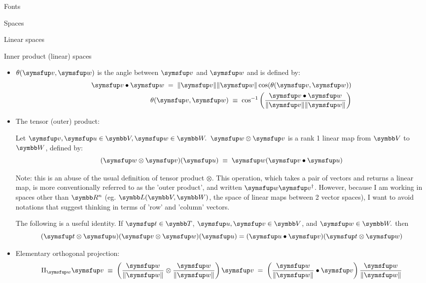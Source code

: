\documentclass[12pt]{PalisadesLakesArticle}
\begin{document}
\begin{plSection}{Fonts}
\begin{plSection}{Spaces}
\begin{plSection}{Linear spaces}
\begin{plSection}{Inner product (linear) spaces}
\begin{itemize}
\item $\theta(\Vector{v},\Vector{w})$ is the angle between $\Vector{v}$ and $\Vector{w}$
and is defined by:
\begin{eqnarray}
\Vector{v} \bullet \Vector{w} \; = \; \| \Vector{v} \| \| \Vector{w} \| \cos(\theta(\Vector{v},\Vector{w}))
\\
\theta(\Vector{v},\Vector{w})
\; \equiv \;
\cos^{-1} \left(\frac{ \Vector{v} \bullet \Vector{w} }{\| \Vector{v} \| \| \Vector{w} \| } \right)
\nonumber
\end{eqnarray}

\item The tensor (outer) product:

Let $\Vector{v}, \Vector{u} \in \Space{V}, \Vector{w} \in \Space{W}.$
$\Vector{w} \otimes \Vector{v}$ is a rank 1 linear map
from $\Space{V}$ to $\Space{W}$, defined by:
\begin{equation}
(\Vector{w} \otimes \Vector{v})
(\Vector{u}) \; \equiv \; \Vector{w} 
(\Vector{v} \bullet \Vector{u})
\end{equation}

Note: this is an abuse of the usual definition of tensor product $\otimes$.
This operation, which takes a pair of vectors and returns a linear map,
is more conventionally referred to as the 'outer product',
and written $\Vector{w} \Vector{v}^{\dagger}$.
However, because I am working in spaces other than $\Reals^n$
(eg. $\Space{L}(\Space{V},\Space{W})$, the space of linear maps
between 2 vector spaces),
I want to avoid notations that suggest thinking in terms
of 'row' and 'column' vectors.

The following is a useful identity.
If $\Vector{t} \in \Space{T}$, 
$\Vector{u}, \Vector{v} \in \Space{V}$, 
and $\Vector{w} \in \Space{W}.$
then
\begin{equation}
\label{eq:tensor-dot}
(\Vector{t} \otimes \Vector{u}) 
(\Vector{v} \otimes \Vector{w})(\Vector{u}) 
= (\Vector{u} \bullet \Vector{v}) (\Vector{t} \otimes \Vector{w})
\end{equation}

\item Elementary orthogonal projection:
\begin{equation}
\Projection_{\Vector{w}} \Vector{v}
\; \equiv \;
\left( \frac{ \Vector{w} }{ \| \Vector{w} \| } \otimes 
\frac{ \Vector{w} }{ \| \Vector{w} \| } \right) \Vector{v}
\; = \;
\left(
\frac{\Vector{w} }{\|\Vector{w}\|} \bullet \Vector{v} 
\right) 
\frac{\Vector{w}}{\|\Vector{w}\|}
\end{equation}


\end{itemize}
\end{plSection}
\end{plSection}
\end{plSection}
\end{plSection}
\end{document}
